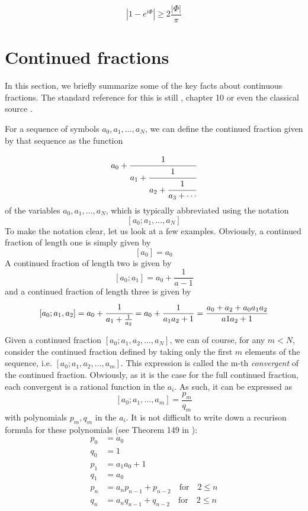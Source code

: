 \documentclass[a4paper, draft]{article}
\theoremstyle{own}
\theoremstyle{remark}
\begin{document}
$$
| 1- e^{i\Phi}|   \geq 2 \frac{|\Phi|}{\pi}
$$

\section{Continued fractions}

In this section, we briefly summarize some of the key facts about continuous fractions. The standard reference for this is still \cite{HW}, chapter 10 or even the classical source \cite{Perron}.

For a sequence of symbols $a_0, a_1, \dots, a_N$, we can define the continued fraction given by that sequence as the function

$$
a_0+\cfrac{1}{a_1+\cfrac{1}{a_2+\cfrac{1}{a_3+\cdots}}}
$$
of the variables $a_0, a_1, \dots, a_N$, which is typically abbreviated using the notation
$$
[a_0 ; a_1, \dots, a_N]
$$
To make the notation clear, let us look at a few examples. Obviously, a continued fraction of length one is simply given by
$$
[a_0] = a_0
$$
A continued fraction of length two is given by
$$
[a_0;a_1] = a_0 + \frac{1}{a-1}
$$
and a continued fraction of length three is given by
$$
[a_0;a_1,a_2] = a_0 + \cfrac{1}{a_1 + \frac{1}{a_2}} = a_0 + \frac{1}{a_1a_2 + 1} = \frac{a_0 + a_2 + a_0 a_1 a_2}{a1a_2 + 1}
$$

Given a continued fraction $[a_0;a_1, a_2, \dots, a_N]$, we can of course, for any $m < N$, consider the continued fraction defined by taking only the first $m$ elements of the sequence, i.e. $[a_0;a_1, a_2, \dots, a_m]$. This expression is called the m-th \emph{convergent} of the continued fraction. Obviously, as it is the case for the full continued fraction, each convergent is a rational function in the $a_i$. As such, it can be expressed as
$$
[a_0; a_1, \dots, a_m] = \frac{p_m}{q_m}
$$
with polynomials $p_m, q_m$ in the $a_i$. It is not difficult to write down a recurison formula for these polynomials (see Theorem 149 in \cite{HW0}):
\begin{align*}
p_0 &= a_0 \\
q_0 &= 1 \\
p_1 &= a_1 a_0 + 1 \\
q_1 &= a_0 \\
p_n &= a_n p_{n-1} + p_{n-2} \quad \text{for} \quad 2 \leq n \\
q_n &= a_n q_{n-1} + q_{n-2} \quad \text{for} \quad 2 \leq n 
\end{align*}	
\end{document}
